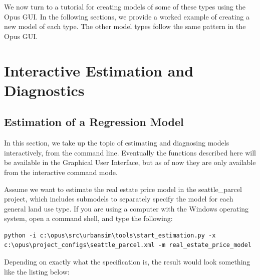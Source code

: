 We now turn to a tutorial for creating models of some of these types using the Opus GUI.  In the following sections, we provide a worked example of creating a new model of each type.  The other model types follow the same pattern in the Opus GUI.


\section{Interactive Estimation and Diagnostics}

\subsection{Estimation of a Regression Model}

In this section, we take up the topic of estimating and diagnosing models interactively, from the command line.  Eventually the functions described here will be available in the Graphical User Interface, but as of now they are only available from the interactive command mode.

Assume we want to estimate the real estate price model in the seattle\_parcel project, which includes submodels to separately specify the model for each general land use type.  If you are using a computer with the Windows operating system, open a command shell, and type the following:

\begin{lstlisting}
python -i c:\opus\src\urbansim\tools\start_estimation.py -x c:\opus\project_configs\seattle_parcel.xml -m real_estate_price_model
\end{lstlisting}

Depending on exactly what the specification is, the result would look something like the listing below:\\

